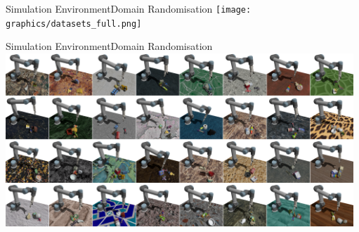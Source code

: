 \begin{frame}{Simulation Environment}{Domain Randomisation}
    \centering
    \texttt{[image: graphics/datasets\_full.png]}
\end{frame}

\begin{frame}{Simulation Environment}{Domain Randomisation}
    \centering
    \includegraphics[height=6.5cm]{graphics/domain_randomisation.png}
\end{frame}

